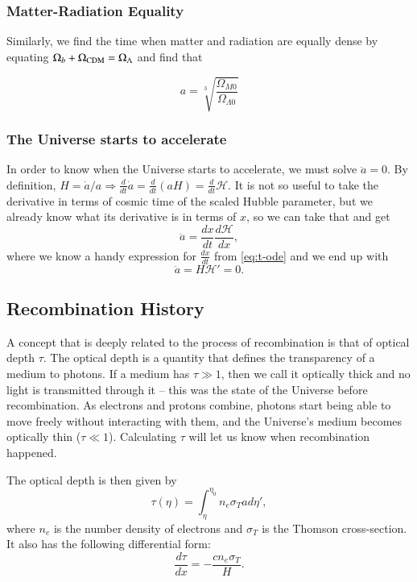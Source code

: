 \documentclass{aa}
\begin{document}
\subsubsection{Matter-Radiation Equality}

Similarly, we find the time when matter and radiation are equally dense by equating $\Omega_b + \Omega_{\rm CDM} = \Omega_{\Lambda}$ and find that

\begin{equation}
    a = \sqrt[3]{\frac{\Omega_{M0}}{\Omega_{\Lambda0}}}
\end{equation}

\subsubsection{The Universe starts to accelerate}

In order to know when the Universe starts to accelerate, we must solve $\ddot a = 0$. By definition, $H = \dot{a}/a \Rightarrow \frac{d}{dt} \dot a = \frac{d}{dt} (aH) = \frac{d}{dt}\mathcal H$. It is not so useful to take the derivative in terms of cosmic time of the scaled Hubble parameter, but we already know what its derivative is in terms of $x$, so we can take that and get
\begin{equation}
    \ddot a = \frac{dx}{dt}\frac{d\mathcal H}{dx},
\end{equation}
where we know a handy expression for $\frac{dx}{dt}$ from \eqref{eq:t-ode} and we end up with
\begin{equation}
    \ddot a = H\mathcal{H'} = 0.
\end{equation}

\subsection{Recombination History}

A concept that is deeply related to the process of recombination is that of optical depth $\tau$. The optical depth is a quantity that defines the transparency of a medium to photons. If a medium has $\tau\gg1$, then we call it optically thick and no light is transmitted through it -- this was the state of the Universe before recombination. As electrons and protons combine, photons start being able to move freely without interacting with them, and the Universe's medium becomes optically thin ($\tau\ll 1$). Calculating $\tau$ will let us know when recombination happened.

The optical depth is then given by
\begin{equation}
\tau(\eta) = \int_{\eta}^{\eta_0} n_e \sigma_T a d\eta',
\end{equation}
where $n_e$ is the number density of electrons and $\sigma_T$ is the Thomson cross-section. It also has the following differential form:
\begin{equation}
\frac{d\tau}{dx} = -\frac{c n_e \sigma_T}{H}.
\end{equation}
\end{document}
